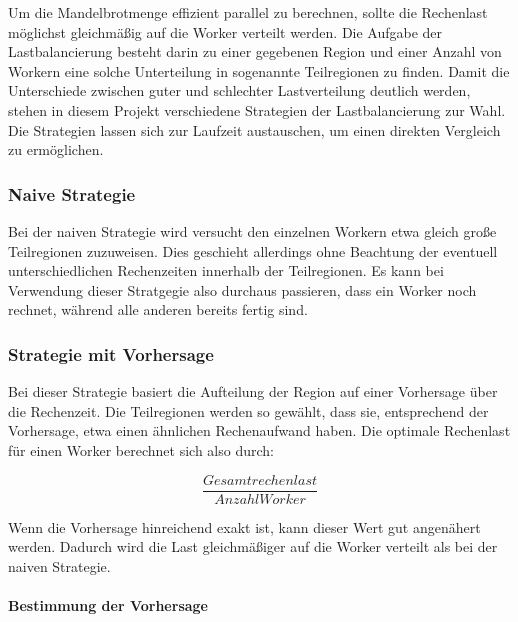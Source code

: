 Um die Mandelbrotmenge effizient parallel zu berechnen, sollte die Rechenlast möglichst gleichmäßig auf die Worker verteilt werden.
Die Aufgabe der Lastbalancierung besteht darin zu einer gegebenen Region und einer Anzahl von Workern eine solche Unterteilung in sogenannte Teilregionen zu finden.
Damit die Unterschiede zwischen guter und schlechter Lastverteilung deutlich werden, stehen in diesem Projekt verschiedene Strategien der Lastbalancierung zur Wahl.
Die Strategien lassen sich zur Laufzeit austauschen, um einen direkten Vergleich zu ermöglichen.

\subsubsection{Naive Strategie}

Bei der naiven Strategie wird versucht den einzelnen Workern etwa gleich große Teilregionen zuzuweisen.
Dies geschieht allerdings ohne Beachtung der eventuell unterschiedlichen Rechenzeiten innerhalb der Teilregionen.
Es kann bei Verwendung dieser Stratgegie also durchaus passieren, dass ein Worker noch rechnet, während alle anderen bereits fertig sind.

\subsubsection{Strategie mit Vorhersage}

Bei dieser Strategie basiert die Aufteilung der Region auf einer Vorhersage über die Rechenzeit.
Die Teilregionen werden so gewählt, dass sie, entsprechend der Vorhersage, etwa einen ähnlichen Rechenaufwand haben.
Die optimale Rechenlast für einen Worker berechnet sich also durch:

\begin{equation}\label{equ:desiredN}
	\frac{Gesamtrechenlast}{AnzahlWorker}
\end{equation}

Wenn die Vorhersage hinreichend exakt ist, kann dieser Wert gut angenähert werden.
Dadurch wird die Last gleichmäßiger auf die Worker verteilt als bei der naiven Strategie.

\paragraph*{Bestimmung der Vorhersage}

